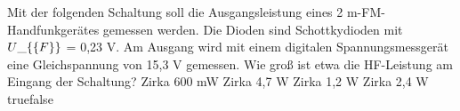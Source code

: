     {Mit der folgenden Schaltung soll die Ausgangsleistung eines 2 m-FM-Handfunkgerätes gemessen werden. Die Dioden sind Schottkydioden mit $U\_\{\textrm\{F\}\}$ = 0,23 V. Am Ausgang wird mit einem digitalen Spannungsmessgerät eine Gleichspannung von 15,3 V gemessen. Wie groß ist etwa die HF-Leistung am Eingang der Schaltung?}
    {Zirka 600 mW}
    {Zirka 4,7 W}
    {Zirka 1,2 W}
    {Zirka 2,4 W}
    {true}{false}
